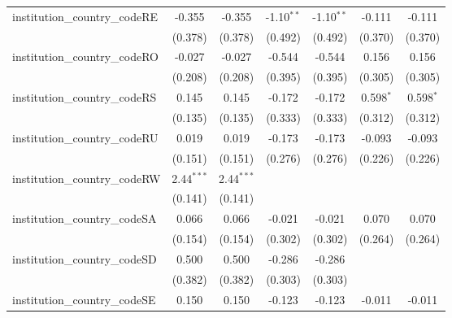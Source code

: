 \begin{tabular}{lcccccc}
   institution\_country\_codeRE          & -0.355         & -0.355         & -1.10$^{**}$   & -1.10$^{**}$   & -0.111         & -0.111\\   
                                         & (0.378)        & (0.378)        & (0.492)        & (0.492)        & (0.370)        & (0.370)\\   
   institution\_country\_codeRO          & -0.027         & -0.027         & -0.544         & -0.544         & 0.156          & 0.156\\   
                                         & (0.208)        & (0.208)        & (0.395)        & (0.395)        & (0.305)        & (0.305)\\   
   institution\_country\_codeRS          & 0.145          & 0.145          & -0.172         & -0.172         & 0.598$^{*}$    & 0.598$^{*}$\\   
                                         & (0.135)        & (0.135)        & (0.333)        & (0.333)        & (0.312)        & (0.312)\\   
   institution\_country\_codeRU          & 0.019          & 0.019          & -0.173         & -0.173         & -0.093         & -0.093\\   
                                         & (0.151)        & (0.151)        & (0.276)        & (0.276)        & (0.226)        & (0.226)\\   
   institution\_country\_codeRW          & 2.44$^{***}$   & 2.44$^{***}$   &                &                &                &   \\   
                                         & (0.141)        & (0.141)        &                &                &                &   \\   
   institution\_country\_codeSA          & 0.066          & 0.066          & -0.021         & -0.021         & 0.070          & 0.070\\   
                                         & (0.154)        & (0.154)        & (0.302)        & (0.302)        & (0.264)        & (0.264)\\   
   institution\_country\_codeSD          & 0.500          & 0.500          & -0.286         & -0.286         &                &   \\   
                                         & (0.382)        & (0.382)        & (0.303)        & (0.303)        &                &   \\   
   institution\_country\_codeSE          & 0.150          & 0.150          & -0.123         & -0.123         & -0.011         & -0.011\\   

\end{tabular}
